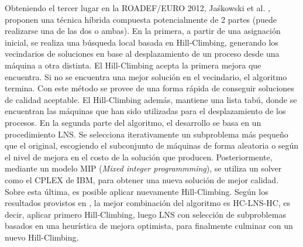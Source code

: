 \documentclass[../informe2.tex]{subfiles}
\begin{document}
Obteniendo el tercer lugar en la ROADEF/EURO 2012, Jaśkowski et al. \cite{jaskowskihybrid}, proponen una técnica híbrida compuesta potencialmente de 2 partes (puede realizarse una de las dos o ambas). En la primera, a partir de una asignación inicial, se realiza una búsqueda local basada en Hill-Climbing, generando los vecindarios de soluciones en base al desplazamiento de un proceso desde una máquina a otra distinta. El Hill-Climbing acepta la primera mejora que encuentra. Si no se encuentra una mejor solución en el vecindario, el algoritmo termina. Con este método se provee de una forma rápida de conseguir soluciones de calidad aceptable. El Hill-Climbing además, mantiene una lista tabú, donde se encuentran las máquinas que han sido utilizadas para el desplazamiento de los procesos. En la segunda parte del algoritmo, el desarrollo se basa en un procedimiento LNS. Se selecciona iterativamente un subproblema más pequeño que el original, escogiendo el subconjunto de máquinas de forma aleatoria o según el nivel de mejora en el costo de la solución que producen. Posteriormente, mediante un modelo MIP (\emph{Mixed integer programmming}), se utiliza un solver como el CPLEX de IBM, para obtener una nueva solución de mejor calidad. Sobre esta última, es posible aplicar nuevamente Hill-Climbing. Según los resultados provistos en \cite{jaskowskihybrid}, la mejor combinación del algoritmo es HC-LNS-HC, es decir, aplicar primero Hill-Climbing, luego LNS con selección de subproblemas basados en una heurística de mejora optimista, para finalmente culminar con un nuevo Hill-Climbing. \\
\end{document}
